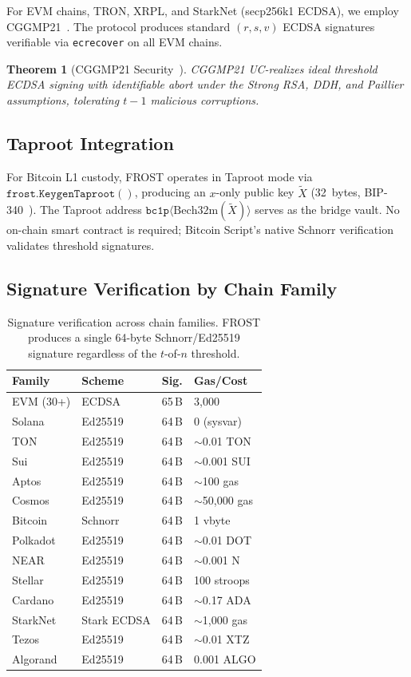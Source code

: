 \documentclass[11pt]{article}
\newtheorem{theorem}{Theorem}
\begin{document}
For EVM chains, TRON, XRPL, and StarkNet (secp256k1 ECDSA), we employ CGGMP21~\cite{cggmp21}. The protocol produces standard $(r, s, v)$ ECDSA signatures verifiable via \texttt{ecrecover} on all EVM chains.

\begin{theorem}[CGGMP21 Security~\cite{cggmp21}]
CGGMP21 UC-realizes ideal threshold ECDSA signing with identifiable abort under the Strong RSA, DDH, and Paillier assumptions, tolerating $t - 1$ malicious corruptions.
\end{theorem}

\subsection{Taproot Integration}

For Bitcoin L1 custody, FROST operates in Taproot mode via $\texttt{frost.KeygenTaproot}()$, producing an $x$-only public key $\tilde{X}$ (32~bytes, BIP-340~\cite{bip340}). The Taproot address $\texttt{bc1p}\langle\text{Bech32m}(\tilde{X})\rangle$ serves as the bridge vault. No on-chain smart contract is required; Bitcoin Script's native Schnorr verification validates threshold signatures.

\subsection{Signature Verification by Chain Family}

\begin{table}[h]
\centering
\small
\begin{tabular}{llll}
\toprule
\textbf{Family} & \textbf{Scheme} & \textbf{Sig.} & \textbf{Gas/Cost} \\
\midrule
EVM (30+) & ECDSA & 65\,B & 3{,}000 \\
Solana & Ed25519 & 64\,B & 0 (sysvar) \\
TON & Ed25519 & 64\,B & $\sim$0.01 TON \\
Sui & Ed25519 & 64\,B & $\sim$0.001 SUI \\
Aptos & Ed25519 & 64\,B & $\sim$100 gas \\
Cosmos & Ed25519 & 64\,B & $\sim$50{,}000 gas \\
Bitcoin & Schnorr & 64\,B & 1 vbyte \\
Polkadot & Ed25519 & 64\,B & $\sim$0.01 DOT \\
NEAR & Ed25519 & 64\,B & $\sim$0.001 N \\
Stellar & Ed25519 & 64\,B & 100 stroops \\
Cardano & Ed25519 & 64\,B & $\sim$0.17 ADA \\
StarkNet & Stark ECDSA & 64\,B & $\sim$1{,}000 gas \\
Tezos & Ed25519 & 64\,B & $\sim$0.01 XTZ \\
Algorand & Ed25519 & 64\,B & 0.001 ALGO \\
\bottomrule
\end{tabular}
\caption{Signature verification across chain families. FROST produces a single 64-byte Schnorr/Ed25519 signature regardless of the $t$-of-$n$ threshold.}
\label{tab:sigverify}
\end{table}
\end{document}
